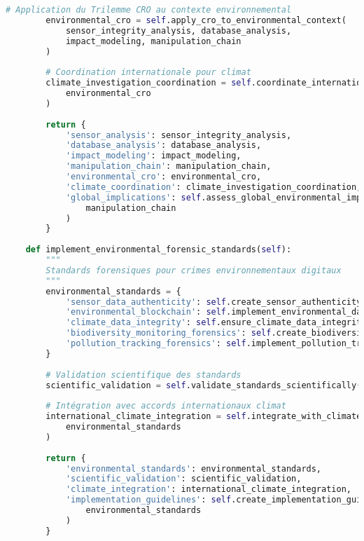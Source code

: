\begin{lstlisting}[language=Python, caption=Investigation de criminalité environnementale digitale]
        # Application du Trilemme CRO au contexte environnemental
        environmental_cro = self.apply_cro_to_environmental_context(
            sensor_integrity_analysis, database_analysis, 
            impact_modeling, manipulation_chain
        )
        
        # Coordination internationale pour climat
        climate_investigation_coordination = self.coordinate_international_climate_investigation(
            environmental_cro
        )
        
        return {
            'sensor_analysis': sensor_integrity_analysis,
            'database_analysis': database_analysis,
            'impact_modeling': impact_modeling,
            'manipulation_chain': manipulation_chain,
            'environmental_cro': environmental_cro,
            'climate_coordination': climate_investigation_coordination,
            'global_implications': self.assess_global_environmental_implications(
                manipulation_chain
            )
        }
    
    def implement_environmental_forensic_standards(self):
        """
        Standards forensiques pour crimes environnementaux digitaux
        """
        environmental_standards = {
            'sensor_data_authenticity': self.create_sensor_authenticity_standards(),
            'environmental_blockchain': self.implement_environmental_data_blockchain(),
            'climate_data_integrity': self.ensure_climate_data_integrity(),
            'biodiversity_monitoring_forensics': self.create_biodiversity_monitoring_forensics(),
            'pollution_tracking_forensics': self.implement_pollution_tracking_forensics()
        }
        
        # Validation scientifique des standards
        scientific_validation = self.validate_standards_scientifically(environmental_standards)
        
        # Intégration avec accords internationaux climat
        international_climate_integration = self.integrate_with_climate_agreements(
            environmental_standards
        )
        
        return {
            'environmental_standards': environmental_standards,
            'scientific_validation': scientific_validation,
            'climate_integration': international_climate_integration,
            'implementation_guidelines': self.create_implementation_guidelines(
                environmental_standards
            )
        }
\end{lstlisting}

